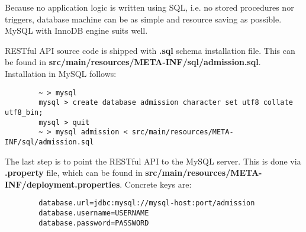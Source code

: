 	Because no application logic is written using SQL, i.e. no stored procedures nor triggers, database machine can be as
	simple and resource saving as possible. MySQL with InnoDB engine suits well.

	RESTful API source code is shipped with \textbf{.sql} schema installation file. This can be found in
	\textbf{src/main/resources/META-INF/sql/admission.sql}. Installation in MySQL follows:
	
	\begin{verbatim}
		~ > mysql
		mysql > create database admission character set utf8 collate utf8_bin;
		mysql > quit
		~ > mysql admission < src/main/resources/META-INF/sql/admission.sql 
	\end{verbatim}

	The last step is to point the RESTful API to the MySQL server. This is done via \textbf{.property} file, which can be
	found in \textbf{src/main/resources/META-INF/deployment.properties}. Concrete keys are:
	
	\begin{verbatim}
		database.url=jdbc:mysql://mysql-host:port/admission
		database.username=USERNAME
		database.password=PASSWORD
	\end{verbatim}

